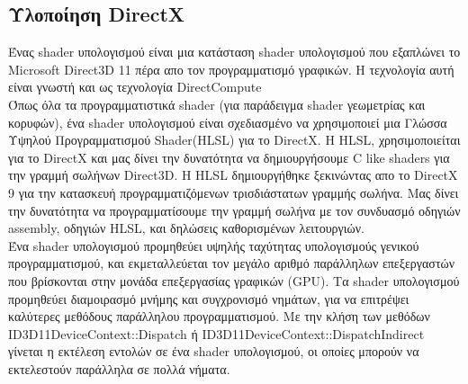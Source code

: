 \subsection{Υλοποίηση DirectX}
Ένας shader υπολογισμού είναι μια κατάσταση shader υπολογισμού που εξαπλώνει το Microsoft Direct3D 11 πέρα απο τον προγραμματισμό γραφικών. Η τεχνολογία αυτή είναι γνωστή και ως τεχνολογία DirectCompute\cite{computeshaders-2}
\\Όπως όλα τα προγραμματιστικά shader (για παράδειγμα shader γεωμετρίας και κορυφών), ένα shader υπολογισμού είναι σχεδιασμένο να χρησιμοποιεί μια Γλώσσα Υψηλού Προγραμματισμού Shader(HLSL) για το DirectX. Η HLSL, χρησιμοποιείται για το DirectX και μας δίνει την δυνατότητα να δημιουργήσουμε C like shaders για την γραμμή σωλήνων Direct3D. Η HLSL δημιουργήθηκε ξεκινώντας απο το DirectX 9 για την κατασκευή προγραμματιζόμενων τρισδιάστατων γραμμής σωλήνα. Μας δίνει την δυνατότητα να προγραμματίσουμε την γραμμή σωλήνα με τον συνδυασμό οδηγιών assembly, οδηγιών HLSL, και δηλώσεις καθορισμένων λειτουργιών.\\
Ένα shader υπολογισμού προμηθεύει υψηλής ταχύτητας υπολογισμούς γενικού προγραμματισμού, και εκμεταλλεύεται τον μεγάλο αριθμό παράλληλων επεξεργαστών που βρίσκονται στην μονάδα επεξεργασίας γραφικών (GPU). Τα shader υπολογισμού προμηθεύει διαμοιρασμό μνήμης και συγχρονισμό νημάτων, για να επιτρέψει καλύτερες μεθόδους παράλληλου προγραμματισμού. Με την κλήση των μεθόδων ID3D11DeviceContext::Dispatch ή ID3D11DeviceContext::DispatchIndirect γίνεται η εκτέλεση εντολών σε ένα shader υπολογισμού, οι οποίες μπορούν να εκτελεστούν παράλληλα σε πολλά νήματα.